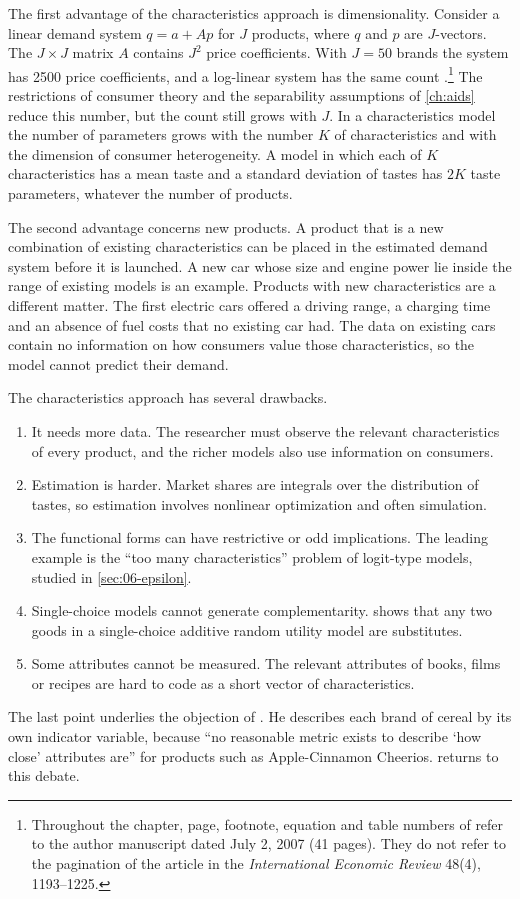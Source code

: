 The first advantage of the characteristics approach is dimensionality. Consider a linear demand system
$q = a + Ap$ for $J$ products, where $q$ and $p$ are $J$-vectors. The $J\times J$ matrix $A$ contains $J^2$
price coefficients. With $J = 50$ brands the system has \num{2500} price coefficients, and a log-linear system
has the same count \citep[footnote 1]{BerryPakes2007}.\footnote{Throughout the chapter, page, footnote, equation
and table numbers of \citet{BerryPakes2007} refer to the author manuscript dated July 2, 2007 (41 pages). They do
not refer to the pagination of the article in the \emph{International Economic Review} 48(4), 1193--1225.} The
restrictions of consumer theory and the separability
assumptions of \cref{ch:aids} reduce this number, but the count still grows with $J$. In a characteristics
model the number of parameters grows with the number $K$ of characteristics and with the dimension of consumer
heterogeneity. A model in which each of $K$ characteristics has a mean taste and a standard deviation of tastes
has $2K$ taste parameters, whatever the number of products.

The second advantage concerns new products. A product that is a new combination of existing characteristics
can be placed in the estimated demand system before it is launched. A new car whose size and engine power lie
inside the range of existing models is an example. Products with new characteristics are a different matter.
The first electric cars offered a driving range, a charging time and an absence of fuel costs that no existing
car had. The data on existing cars contain no information on how consumers value those characteristics, so the
model cannot predict their demand.

The characteristics approach has several drawbacks.
\begin{enumerate}
  \item It needs more data. The researcher must observe the relevant characteristics of every product, and
  the richer models also use information on consumers.
  \item Estimation is harder. Market shares are integrals over the distribution of tastes, so estimation
  involves nonlinear optimization and often simulation.
  \item The functional forms can have restrictive or odd implications. The leading example is the ``too many
  characteristics'' problem of logit-type models, studied in \cref{sec:06-epsilon}.
  \item Single-choice models cannot generate complementarity.  shows that any two goods in a
  single-choice additive random utility model are substitutes.
  \item Some attributes cannot be measured. The relevant attributes of books, films or recipes are hard to code
  as a short vector of characteristics.
\end{enumerate}
The last point underlies the objection of \citet[sec.~5.5]{Hausman1997}. He describes each brand of cereal by
its own indicator variable, because ``no reasonable metric exists to describe `how close' attributes are'' for
products such as Apple-Cinnamon Cheerios.  returns to this debate.

